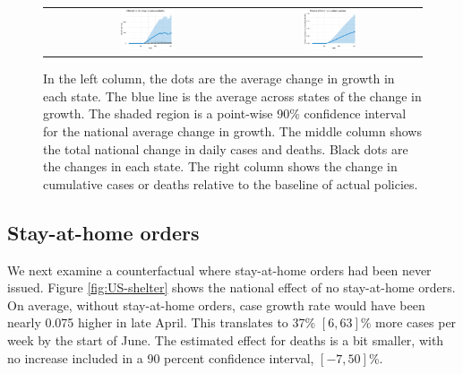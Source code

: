 \documentclass[11pt,reqno,letter]{amsart}
\theoremstyle{definition}
\begin{document}
\begin{figure}[ht]
\begin{minipage}{\linewidth}
\begin{tabular}{ccc}
      &
        \includegraphics[width=0.31\textwidth]{tables_and_figures/us-index-dcases_deaths_idx}
      &
        \includegraphics[width=0.31\textwidth]{tables_and_figures/us-index-rcumu_deaths_idx}
    \end{tabular}

    \begin{flushleft}
      \footnotesize In the left column, the dots are the average
      change in growth in each state. The blue line is the average
      across states of the change in growth. The shaded region is a
      point-wise 90\% confidence interval for the national average
      change in growth.  The middle column shows the total national
      change in daily cases and deaths. Black dots are the changes in each
      state.  The right column shows the change in cumulative cases or
      deaths relative to the baseline of actual policies.
    \end{flushleft}
  \end{minipage}
\end{figure}


\subsection{Stay-at-home orders}

We next examine a counterfactual where stay-at-home orders had been never
issued.  Figure \ref{fig:US-shelter} shows the national effect of no
stay-at-home orders. On average, without stay-at-home orders, case
growth rate would have been nearly 0.075 higher in late April. This
translates to 37\% $[6,63]$\% more cases per week by the start of June. The
estimated effect for deaths is a bit smaller, with no
increase included in a 90 percent confidence interval, $[-7,50]$\%.
\end{document}
